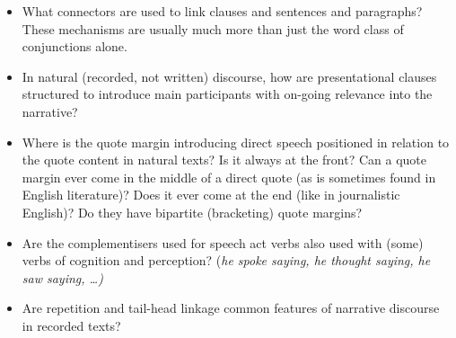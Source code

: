 \begin{itemize}
	\item	What connectors are used to link clauses
				and sentences and paragraphs? These mechanisms are usually much
				more than just the word class of conjunctions alone.

	\item	In natural (recorded,
				not written) discourse, how are presentational clauses structured
				to introduce main participants with on-going relevance into the
				narrative?
				
	\item	Where is the quote margin introducing direct speech positioned
				in relation to the quote content in natural texts? Is it always
				at the front? Can a quote margin ever come in the middle of a
				direct quote (as is sometimes found in English literature)? Does
				it ever come at the end (like in journalistic English)? Do they
				have bipartite (bracketing) quote margins?

	\item	Are the complementisers used for speech act verbs also used
				with (some) verbs of cognition
				and perception? (\it{he spoke saying,
				he thought saying, he saw saying,
				{\ldots}})
				
	\item	Are repetition
				and tail-head linkage common features of narrative discourse
				in recorded texts? 
\end{itemize}